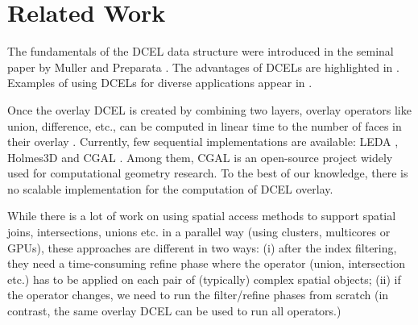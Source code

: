 \section{Related Work}\label{sec:related}
The fundamentals of the DCEL data structure were introduced in the seminal paper by Muller and Preparata  \cite{muller_finding_1978}. The advantages of DCELs are highlighted in \cite{preparata_computational_1985, berg_computational_2008}. Examples of using DCELs for diverse applications appear in \cite{barequet_dcel_1998, boltcheva_topological-based_2020, freiseisen_colored_1998}.

Once the overlay DCEL is created by combining two layers, overlay operators like union, difference, etc., can be computed in linear time to the number of faces in their overlay \cite{freiseisen_colored_1998}. 
Currently, few sequential implementations are available: LEDA \cite{mehlhorn_leda_1995}, Holmes3D
\cite{holmes_dcel_2021} and CGAL \cite{fogel_cgal_2012}. Among them, CGAL is an open-source project widely used for computational geometry research. To the best of our knowledge, there is no scalable implementation for the computation of DCEL overlay.

While there is a lot of work on using spatial access methods to support spatial joins, intersections, unions etc. in a parallel way (using clusters, multicores or GPUs), \cite{challa_dd-rtree_2016, sabek_spatial_2017, li_scalable_2019, franklin_data_2018, magalhaes_fast_2015, puri_efficient_2013, puri_mapreduce_2013} these approaches are different in two ways: (i) after the index filtering, they need a time-consuming refine phase where the operator (union, intersection etc.) has to be applied on each pair of (typically) complex spatial objects; (ii) if the operator changes, we need to run the filter/refine phases from scratch (in contrast, the same overlay DCEL can be used to run all operators.)
